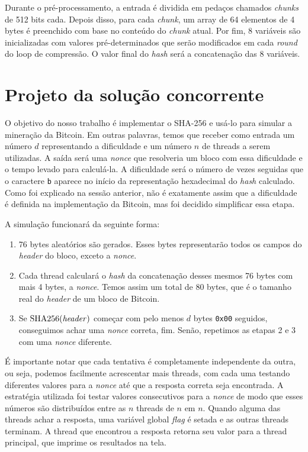 \documentclass[12pt]{article}
\DeclareMathOperator{\sha}{SHA256}
\begin{document}
Durante o pré-processamento,
a entrada é dividida em
pedaços chamados \textit{chunks} de 512 bits cada.
Depois disso, para cada \textit{chunk},
um array de 64 elementos de 4 bytes é
preenchido com base no conteúdo do \textit{chunk} atual.
Por fim, 8 variáveis são inicializadas com valores pré-determinados
que serão modificados em cada \textit{round} do loop de compressão.
O valor final do \textit{hash} será a concatenação das 8 variáveis.

\section{Projeto da solução concorrente}
O objetivo do nosso trabalho é
implementar o SHA-256 e
usá-lo para simular a mineração da Bitcoin.
Em outras palavras,
temos que receber como entrada
um número $d$ representando a dificuldade e
um número $n$ de threads a serem utilizadas.
A saída será uma \textit{nonce} que
resolveria um bloco com essa dificuldade e
o tempo levado para calculá-la.
A dificuldade será o número de vezes seguidas 
que o caractere \texttt{\textquotesingle{}b\textquotesingle{}} aparece no
início da representação hexadecimal do \textit{hash} calculado.
Como foi explicado na sessão anterior,
não é exatamente assim que a dificuldade é definida
na implementação da Bitcoin,
mas foi decidido simplificar essa etapa.

A simulação funcionará da seguinte forma:
\begin{enumerate}
	\item 76 bytes aleatórios são gerados.
		Esses bytes representarão todos os campos
		do \textit{header} do bloco,
		exceto a \textit{nonce}.
	\item Cada thread calculará o \textit{hash} da concatenação
		desses mesmos 76 bytes com mais 4 bytes, a \textit{nonce}.
		Temos assim um total de 80 bytes,
		que é o tamanho real do \textit{header} de
		um bloco de Bitcoin.
	\item Se $\sha(\text{\textit{header}})$
		começar com pelo menos $d$ bytes \texttt{0x00} seguidos,
		conseguimos achar uma \textit{nonce} correta, fim.
		Senão, repetimos as etapas 2 e 3
		com uma \textit{nonce} diferente.
\end{enumerate}

É importante notar que cada tentativa
é completamente independente da outra, ou seja,
podemos facilmente acrescentar mais threads,
com cada uma testando diferentes valores para a \textit{nonce}
até que a resposta correta seja encontrada.
A estratégia utilizada foi
testar valores consecutivos para a \textit{nonce}
de modo que esses números são distribuídos
entre as $n$ threads de $n$ em $n$.
Quando alguma das threads achar a resposta,
uma variável global \textit{flag} é setada
e as outras threads terminam.
A thread que encontrou a resposta
retorna seu valor para a thread principal,
que imprime os resultados na tela.
\end{document}
